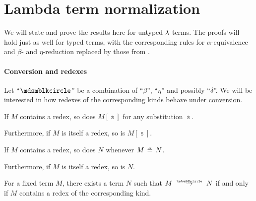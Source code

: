 \section{Lambda term normalization}\label{sec:lambda_term_normalization}

We will state and prove the results here for untyped \( \mathrm{\lambda} \)-terms. The proofs will hold just as well for typed terms, with the corresponding rules for \( \alpha \)-equivalence and \( \beta \)- and \( \eta \)-reduction replaced by those from .

\paragraph{Conversion and redexes}

\begin{proposition}\label{thm:beta_eta_redexes}
  Let \enquote{\( {\Anon} \)} be a combination of \enquote{\( \beta \)}, \enquote{\( \eta \)} and possibly \enquote{\( \delta \)}. We will be interested in how redexes of the corresponding kinds behave under \hyperref[con:lambda_conversion]{conversion}.

  \begin{thmenum}
     If \( M \) contains a redex, so does \( M[\Bbbs] \) for any substitution \( \Bbbs \).

    Furthermore, if \( M \) is itself a redex, so is \( M[\Bbbs] \).

     If \( M \) contains a redex, so does \( N \) whenever \( M \aequiv N \).

    Furthermore, if \( M \) is itself a redex, so is \( N \).

     For a fixed term \( M \), there exists a term \( N \) such that \( M \pred N \) if and only if \( M \) contains a redex of the corresponding kind.
  \end{thmenum}
\end{proposition}

